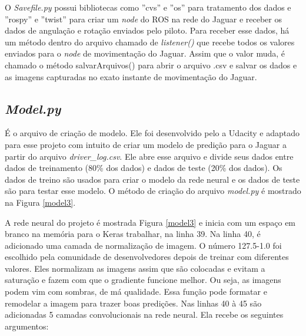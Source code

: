 O \textit{Savefile.py} possui bibliotecas como ''cvs'' e ''os'' para tratamento dos dados e ''rospy'' e ''twist'' para criar um \textit{node} do ROS na rede do Jaguar e receber os dados de angulação e rotação enviados pelo piloto. Para receber esse dados, há um método dentro do arquivo chamado de \textit{listener()} que recebe todos os valores enviados para o \textit{node} de movimentação do Jaguar. Assim que o valor muda, é chamado o método salvarArquivos() para abrir o arquivo .csv e salvar os dados e as imagens capturadas no exato instante de movimentação do Jaguar.

\subsection{\textit{Model.py}}
\label{sec:model.py}

É o arquivo de criação de modelo. 
Ele foi desenvolvido pelo a Udacity e adaptado para esse projeto com intuito de criar um modelo de predição para o Jaguar a partir do arquivo \textit{driver\_log.csv}. Ele abre esse arquivo e divide seus dados entre dados de treinamento (80\% dos dados) e dados de teste (20\% dos dados). Os dados de treino são usados para criar o modelo da rede neural e os dados de teste são para testar esse modelo. O método de criação do arquivo \textit{model.py} é mostrado na Figura \ref{model3}.

	\begin{figure}[H]
		\centering
\end{figure}

A rede neural do projeto é mostrada Figura \ref{model3} e inicia com um espaço em branco na memória para o Keras trabalhar, na linha 39. 
Na linha 40, é adicionado uma camada de normalização de imagem. O número 127.5-1.0 foi escolhido pela comunidade de desenvolvedores depois de treinar com diferentes valores. Eles normalizam as imagens assim que são colocadas e evitam a saturação e fazem com que o gradiente funcione melhor. Ou seja, as imagens podem vim com sombras, de má qualidade. Essa função pode formatar e remodelar a imagem para trazer boas predições.
Nas linhas 40 à 45 são adicionadas 5 camadas convolucionais na rede neural. Ela recebe os seguintes argumentos: 

